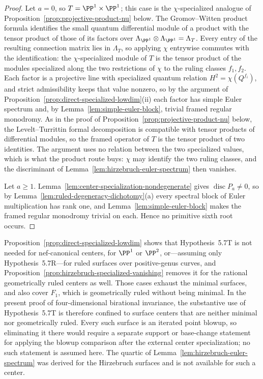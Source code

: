 \begin{proof}
Let \(a=0\), so \(T=\PP^1\times\PP^1\); this case is the \(\chi\)-specialized
analogue of Proposition~\ref{prop:projective-product-nu} below.  The
Gromov--Witten product formula
\cite{BehrendProduct} identifies the small quantum differential module of a
product with the tensor product of those of its factors over
\(\Lambda_{\PP^1}\otimes\Lambda_{\PP^1}=\Lambda_T\).  Every entry of the
resulting connection matrix lies in \(\Lambda_T\), so applying \(\chi\)
entrywise commutes with the identification: the \(\chi\)-specialized module of
\(T\) is the tensor product of the modules specialized along the two
restrictions of \(\chi\) to the ruling classes \(f_1,f_2\).  Each factor is a
projective line with specialized quantum relation \(H^2=\chi(Q^{f_i})\), and strict
admissibility keeps that value nonzero, so by the argument of
Proposition~\ref{prop:direct-specialized-lowdim}(ii) each factor has simple Euler
spectrum and, by Lemma~\ref{lem:simple-euler-block}, trivial framed regular
monodromy.  As in the proof of
Proposition~\ref{prop:projective-product-nu} below, the Levelt--Turrittin formal
decomposition is compatible with tensor products of differential modules, so the
framed operator of \(T\) is the tensor product of two identities.  The argument uses no
relation between the two specialized values, which is what the product route
buys: \(\chi\) may identify the two ruling classes, and the discriminant of
Lemma~\ref{lem:hirzebruch-euler-spectrum} then vanishes.

Let \(a\ge1\).  Lemma~\ref{lem:center-specialization-nondegenerate} gives
\(\operatorname{disc}P_a\ne0\), so by
Lemma~\ref{lem:ruled-degeneracy-dichotomy}(a) every spectral block of Euler
multiplication has rank one, and Lemma~\ref{lem:simple-euler-block} makes the
framed regular monodromy trivial on each.  Hence no primitive sixth root occurs.
\end{proof}

\begin{remark}
\label{rem:tagging-scope}
Proposition~\ref{prop:direct-specialized-lowdim} shows that
Hypothesis~5.7T is not needed for nef-canonical centers, for \(\PP^1\) or
\(\PP^2\), or---assuming only Hypothesis~5.7R---for ruled surfaces over
positive-genus curves, and
Proposition~\ref{prop:hirzebruch-specialized-vanishing} removes it for the
rational geometrically ruled centers as well.  Those cases exhaust the minimal
surfaces, and also cover \(F_1\), which is geometrically ruled without being
minimal.  In the present proof of four-dimensional birational invariance, the
substantive use of Hypothesis~5.7T is therefore confined to surface centers
that are neither minimal nor geometrically ruled.  Every such surface is an iterated point
blowup, so eliminating it there would require a separate support or base-change
statement for applying the blowup comparison after the external center
specialization; no such statement is assumed here.  The quartic of
Lemma~\ref{lem:hirzebruch-euler-spectrum} was derived for the Hirzebruch
surfaces and is not available for such a center.
\end{remark}

